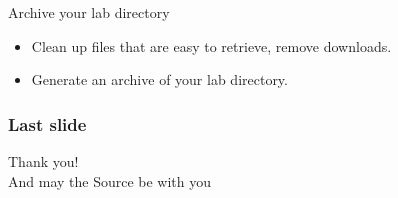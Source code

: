 \setuplabframe
{Archive your lab directory}
{
  \begin{itemize}
  \item Clean up files that are easy to retrieve, remove downloads.
  \item Generate an archive of your lab directory.
  \end{itemize}
}


\begin{frame}
  \frametitle{Last slide}
  \begin{center}
    \Huge
    Thank you!\\
    \huge
    And may the Source be with you\\
  \end{center}
\end{frame}
